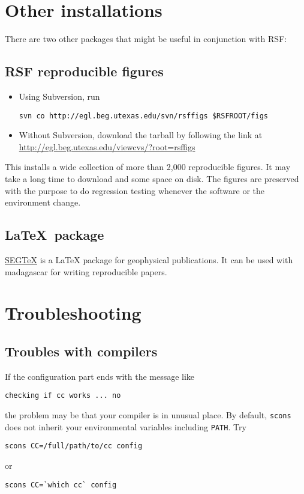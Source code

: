 \section{Other installations}

There are two other packages that might be useful in conjunction with RSF:

\subsection{RSF reproducible figures}

\begin{itemize}
\item Using Subversion, run
\begin{verbatim}
svn co http://egl.beg.utexas.edu/svn/rsffigs $RSFROOT/figs
\end{verbatim}
\item Without Subversion, download the tarball by following the link at
\url{http://egl.beg.utexas.edu/viewcvs/?root=rsffigs}
\end{itemize}
This installs a wide collection of more than 2,000 reproducible
figures. It may take a long time to download and some space on disk.
The figures are preserved with the purpose to do regression testing
whenever the software or the environment change.

\subsection{\LaTeX\ package}

\href{http://segtex.sourceforge.net}{SEGTeX} is a LaTeX package for geophysical publications. 
It can be used with madagascar for writing reproducible papers.

\section{Troubleshooting}

\subsection{Troubles with compilers}
If the configuration part ends with the message like
\begin{verbatim}
checking if cc works ... no
\end{verbatim}
the problem may be that your compiler is in unusual place. By default,
\texttt{scons} does not inherit your environmental variables including
\texttt{PATH}. Try
\begin{verbatim}
scons CC=/full/path/to/cc config
\end{verbatim}
or
\begin{verbatim}
scons CC=`which cc` config
\end{verbatim}

